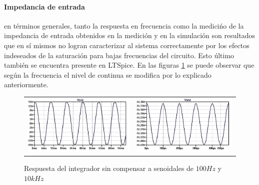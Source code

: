 \paragraph*{Impedancia de entrada} en t\'erminos generales, tanto la respuesta en frecuencia como la medici\'no de la impedancia de entrada
obtenidos en la medici\'on y en la simulaci\'on son resultados que en s\'i mismos no logran caracterizar al sistema correctamente por los efectos indeseados
de la saturaci\'on para bajas frecuencias del circuito. Esto \'ultimo tambi\'en se encuentra presente en LTSpice. En las figuras \ref{fig:integrador_simulacion} se puede observar
que seg\'un la frecuencia el nivel de continua se modifica por lo explicado anteriormente.

\begin{figure}[H]
	\centering
	\begin{tabular}{c c}
		\includegraphics[scale=0.55]{Integrador/Simulaciones/Seno100.png} &
		\includegraphics[scale=0.55]{Integrador/Simulaciones/Seno10k.png}
	\end{tabular}
	\caption{Respuesta del integrador sin compensar a senoidales de $100Hz$ y $10kHz$}
	\label{fig:integrador_simulacion}
\end{figure}

